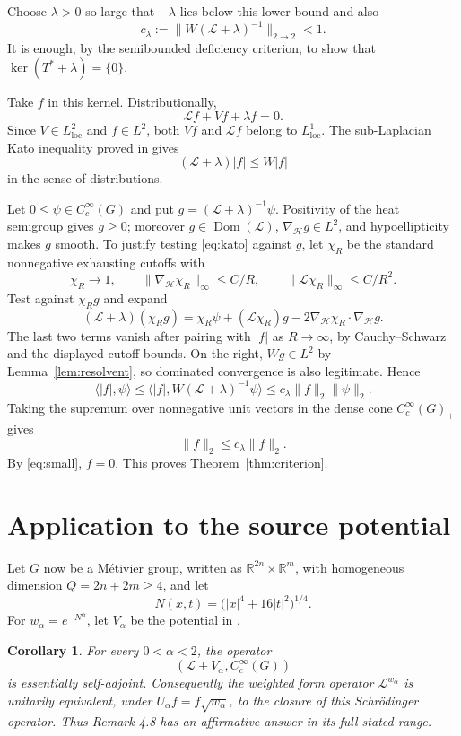 \documentclass[11pt]{article}
\newtheorem{corollary}[theorem]{Corollary}
\newcommand{\Lcal}{\mathcal L}
\newcommand{\Dom}{\operatorname{Dom}}
\newcommand{\R}{\mathbb R}
\begin{document}
Choose $\lambda>0$ so large that $-\lambda$ lies below this lower bound and
also
\begin{equation}\label{eq:small}
 c_\lambda:=\|W(\Lcal+\lambda)^{-1}\|_{2\to2}<1.
\end{equation}
It is enough, by the semibounded deficiency criterion, to show that
$\ker(T^*+\lambda)=\{0\}$.

Take $f$ in this kernel.  Distributionally,
\[
 \Lcal f+Vf+\lambda f=0.
\]
Since $V\in L^2_{\mathrm{loc}}$ and $f\in L^2$, both $Vf$ and $\Lcal f$
belong to $L^1_{\mathrm{loc}}$.  The sub-Laplacian Kato inequality proved in
\cite[Proposition 1.3]{BC} gives
\begin{equation}\label{eq:kato}
 (\Lcal+\lambda)|f|\leq W|f|
\end{equation}
in the sense of distributions.

Let $0\leq\psi\in C_c^\infty(G)$ and put
$g=(\Lcal+\lambda)^{-1}\psi$.  Positivity of the heat semigroup gives
$g\geq0$; moreover $g\in\Dom(\Lcal)$, $\nabla_{\mathcal H}g\in L^2$, and
hypoellipticity makes $g$ smooth.  To justify testing \eqref{eq:kato} against
$g$, let $\chi_R$ be the standard nonnegative exhausting cutoffs with
\[
 \chi_R\to1,\qquad
 \|\nabla_{\mathcal H}\chi_R\|_\infty\leq C/R,
 \qquad \|\Lcal\chi_R\|_\infty\leq C/R^2.
\]
Test against $\chi_Rg$ and expand
\[
 (\Lcal+\lambda)(\chi_Rg)
 =\chi_R\psi+(\Lcal\chi_R)g
  -2\nabla_{\mathcal H}\chi_R\cdot\nabla_{\mathcal H}g.
\]
The last two terms vanish after pairing with $|f|$ as $R\to\infty$, by
Cauchy--Schwarz and the displayed cutoff bounds.  On the right,
$Wg\in L^2$ by Lemma~\ref{lem:resolvent}, so dominated convergence is also
legitimate.  Hence
\[
 \langle |f|,\psi\rangle
 \leq\langle |f|,W(\Lcal+\lambda)^{-1}\psi\rangle
 \leq c_\lambda\|f\|_2\|\psi\|_2.
\]
Taking the supremum over nonnegative unit vectors in the dense cone
$C_c^\infty(G)_+$ gives
\[
 \|f\|_2\leq c_\lambda\|f\|_2.
\]
By \eqref{eq:small}, $f=0$.  This proves
Theorem~\ref{thm:criterion}.

\section{Application to the source potential}

Let $G$ now be a M\'etivier group, written as
$\R^{2n}\times\R^m$, with homogeneous dimension $Q=2n+2m\geq4$, and let
\[
 N(x,t)=\bigl(|x|^4+16|t|^2\bigr)^{1/4}.
\]
For $w_\alpha=e^{-N^\alpha}$, let $V_\alpha$ be the potential in \cite{BC}.

\begin{corollary}\label{cor:source}
For every $0<\alpha<2$, the operator
\[
 (\Lcal+V_\alpha,C_c^\infty(G))
\]
is essentially self-adjoint.  Consequently the weighted form operator
$\Lcal^{w_\alpha}$ is unitarily equivalent, under
$U_\alpha f=f\sqrt{w_\alpha}$, to the closure of this Schr\"odinger operator.
Thus Remark 4.8 has an affirmative answer in its full stated range.
\end{corollary}
\end{document}
